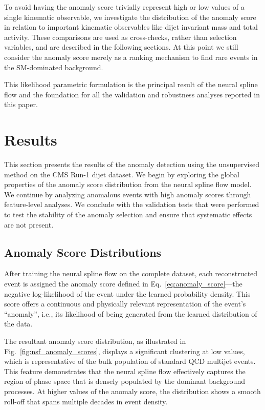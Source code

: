 \documentclass[11pt,a4paper,twocolumn]{article}
\begin{document}
To avoid having the anomaly score trivially represent high or low values of a single kinematic observable, we investigate the distribution of the anomaly score in relation to important kinematic observables like dijet invariant mass and total activity. These comparisons are used as cross-checks, rather than selection variables, and are described in the following sections. At this point we still consider the anomaly score merely as a ranking mechanism to find rare events in the SM-dominated background.

This likelihood parametric formulation is the principal result of the neural spline flow and the foundation for all the validation and robustness analyses reported in this paper.
\section{Results}

This section presents the results of the anomaly detection using the unsupervised method on the CMS Run-1 dijet dataset. We begin by exploring the global properties of the anomaly score distribution from the neural spline flow model. We continue by analyzing anomalous events with high anomaly scores through feature-level analyses. We conclude with the validation tests that were performed to test the stability of the anomaly selection and ensure that systematic effects are not present.

\subsection{Anomaly Score Distributions}

After training the neural spline flow on the complete dataset, each reconstructed event is assigned the anomaly score defined in Eq.~\eqref{eq:anomaly_score}---the negative log-likelihood of the event under the learned probability density. This score offers a continuous and physically relevant representation of the event's ``anomaly'', i.e., its likelihood of being generated from the learned distribution of the data.

The resultant anomaly score distribution, as illustrated in Fig.~\ref{fig:nsf_anomaly_scores}, displays a significant clustering at low values, which is representative of the bulk population of standard QCD multijet events. This feature demonstrates that the neural spline flow effectively captures the region of phase space that is densely populated by the dominant background processes. At higher values of the anomaly score, the distribution shows a smooth roll-off that spans multiple decades in event density.
\end{document}
